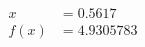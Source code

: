 \documentclass[preview]{standalone}
\begin{document}
\begin{align*}
x &= 0.5617\\f(x) &= 4.9305783
\end{align*}
\end{document}
